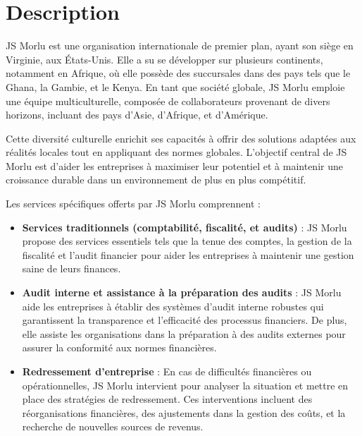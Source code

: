 {\fontsize{16pt}{16pt}\selectfont
\section{Description}

JS Morlu est une organisation internationale de premier plan, ayant son siège en Virginie, aux États-Unis. Elle a su se développer sur plusieurs continents, notamment en Afrique, où elle possède des succursales dans des pays tels que le Ghana, la Gambie, et le Kenya. En tant que société globale, JS Morlu emploie une équipe multiculturelle, composée de collaborateurs provenant de divers horizons, incluant des pays d'Asie, d'Afrique, et d'Amérique. 

\vspace{0.5cm}

Cette diversité culturelle enrichit ses capacités à offrir des solutions adaptées aux réalités locales tout en appliquant des normes globales. L'objectif central de JS Morlu est d'aider les entreprises à maximiser leur potentiel et à maintenir une croissance durable dans un environnement de plus en plus compétitif.

\vspace{0.5cm}

Les services spécifiques offerts par JS Morlu comprennent :

\vspace{0.3cm}

\begin{itemize}
    \item \textbf{Services traditionnels (comptabilité, fiscalité, et audits)} :
JS Morlu propose des services essentiels tels que la tenue des comptes, la gestion de la fiscalité et l’audit financier pour aider les entreprises à maintenir une gestion saine de leurs finances.

\vspace{0.3cm}

\item \textbf{Audit interne et assistance à la préparation des audits} :
JS Morlu aide les entreprises à établir des systèmes d’audit interne robustes qui garantissent la transparence et l'efficacité des processus financiers. De plus, elle assiste les organisations dans la préparation à des audits externes pour assurer la conformité aux normes financières.

\vspace{0.3cm}

\item \textbf{Redressement d'entreprise} :
En cas de difficultés financières ou opérationnelles, JS Morlu intervient pour analyser la situation et mettre en place des stratégies de redressement. Ces interventions incluent des réorganisations financières, des ajustements dans la gestion des coûts, et la recherche de nouvelles sources de revenus.


\end{itemize}}
